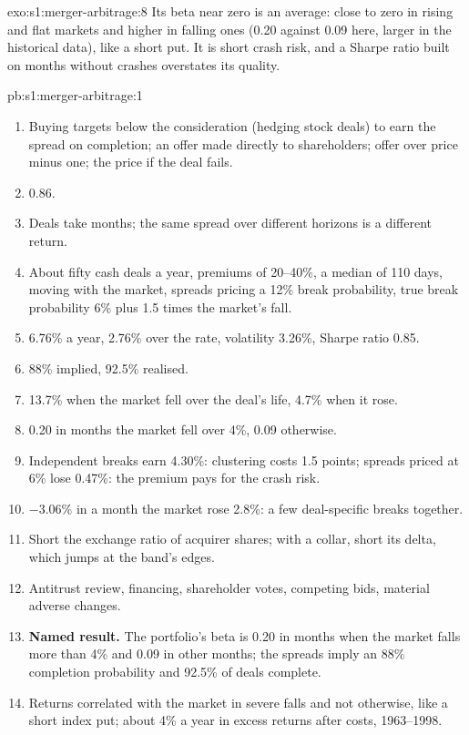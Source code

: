 \begin{solution}{exo:s1:merger-arbitrage:8}
Its beta near zero is an average: close to zero in rising and flat markets and higher in falling ones (0.20 against 0.09 here, larger in the historical
data), like a short put. It is short crash risk, and a Sharpe ratio built on months without crashes overstates its quality.
\end{solution}

\begin{solution}{pb:s1:merger-arbitrage:1}
\begin{enumerate}
\item Buying targets below the consideration (hedging stock deals) to earn the spread on completion; an offer made directly to shareholders; offer over price
minus one; the price if the deal fails.
\item 0.86.
\item Deals take months; the same spread over different horizons is a different return.
\item About fifty cash deals a year, premiums of 20--40\%, a median of 110 days,  moving with the market, spreads pricing a 12\% break
probability, true break probability 6\% plus 1.5 times the market's fall.
\item 6.76\% a year, 2.76\% over the rate, volatility 3.26\%, Sharpe ratio 0.85.
\item 88\% implied, 92.5\% realised.
\item 13.7\% when the market fell over the deal's life, 4.7\% when it rose.
\item 0.20 in months the market fell over 4\%, 0.09 otherwise.
\item Independent breaks earn 4.30\%: clustering costs 1.5 points; spreads priced at 6\% lose 0.47\%: the premium pays for the crash risk.
\item $-3.06\%$ in a month the market rose 2.8\%: a few deal-specific breaks together.
\item Short the exchange ratio of acquirer shares; with a collar, short its delta, which jumps at the band's edges.
\item Antitrust review, financing, shareholder votes, competing bids, material adverse changes.
\item \textbf{Named result.} The portfolio's beta is 0.20 in months when the market falls more than 4\% and 0.09 in other months; the spreads imply an 88\%
completion probability and 92.5\% of deals complete.
\item Returns correlated with the market in severe falls and not otherwise, like a short index put; about 4\% a year in excess returns after costs, 1963--1998.

\end{enumerate}
\end{solution}
